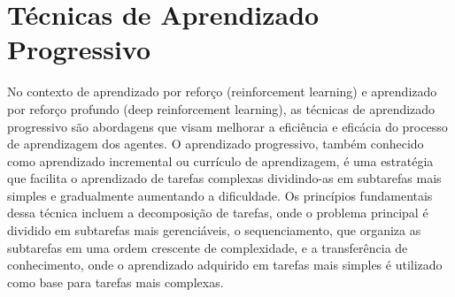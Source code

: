 


\section{Técnicas de Aprendizado Progressivo}
\label{sec:aprendizado_prog}

No contexto de aprendizado por reforço (reinforcement learning) e aprendizado por reforço profundo (deep reinforcement learning), as técnicas de aprendizado progressivo são abordagens que visam melhorar a eficiência e eficácia do processo de aprendizagem dos agentes. O aprendizado progressivo, também conhecido como aprendizado incremental ou currículo de aprendizagem, é uma estratégia que facilita o aprendizado de tarefas complexas dividindo-as em subtarefas mais simples e gradualmente aumentando a dificuldade. Os princípios fundamentais dessa técnica incluem a decomposição de tarefas, onde o problema principal é dividido em subtarefas mais gerenciáveis, o sequenciamento, que organiza as subtarefas em uma ordem crescente de complexidade, e a transferência de conhecimento, onde o aprendizado adquirido em tarefas mais simples é utilizado como base para tarefas mais complexas. 

